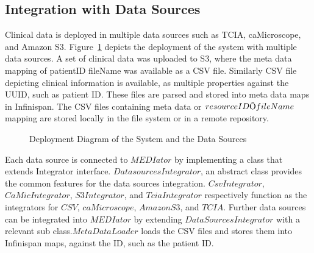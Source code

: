 \documentclass[conference]{IEEEtran}
\begin{document}
\subsection{Integration with Data Sources}
Clinical data is deployed in multiple data sources such as TCIA, caMicroscope, and Amazon S3. Figure~\ref{fig:dsdeployment} depicts the deployment of the system with multiple data sources. A set of clinical data was uploaded to S3, where the meta data mapping of patientID  fileName was available as a CSV file. Similarly CSV file depicting clinical information is available, as multiple properties against the UUID, such as patient ID. These files are parsed and stored into meta data maps in Infinispan. The CSV files containing meta data or $resource ID \ding{213} fileName$ mapping are stored locally in the file system or in a remote repository.
\begin{figure}[!htbp]
\begin{center}
\end{center}
 \caption{Deployment Diagram of the System and the Data Sources}
 \label{fig:dsdeployment}
\end{figure}

Each data source is connected to $MEDIator$ by implementing a class that extends Integrator interface. $DatasourcesIntegrator$, an abstract class provides the common features for the data sources integration. $CsvIntegrator$, $CaMicIntegrator$, $S3Integrator$, and $TciaIntegrator$ respectively function as the integrators for $CSV$, $caMicroscope$, $Amazon S3$, and $TCIA$. Further data sources can be integrated into $MEDIator$ by extending $DataSourcesIntegrator$ with a relevant sub class.$MetaDataLoader$ loads the CSV files and stores them into Infinispan maps, against the ID, such as the patient ID. 
\end{document}
